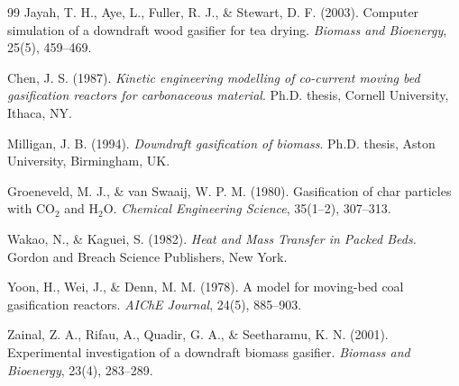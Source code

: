 \documentclass[11pt,a4paper]{article}
\begin{document}
\begin{thebibliography}{99}
Jayah, T. H., Aye, L., Fuller, R. J., \& Stewart, D. F. (2003). Computer simulation of a downdraft wood gasifier for tea drying. \textit{Biomass and Bioenergy}, 25(5), 459--469.

Chen, J. S. (1987). \textit{Kinetic engineering modelling of co-current moving bed gasification reactors for carbonaceous material}. Ph.D. thesis, Cornell University, Ithaca, NY.

Milligan, J. B. (1994). \textit{Downdraft gasification of biomass}. Ph.D. thesis, Aston University, Birmingham, UK.

Groeneveld, M. J., \& van Swaaij, W. P. M. (1980). Gasification of char particles with CO$_2$ and H$_2$O. \textit{Chemical Engineering Science}, 35(1--2), 307--313.

Wakao, N., \& Kaguei, S. (1982). \textit{Heat and Mass Transfer in Packed Beds}. Gordon and Breach Science Publishers, New York.

Yoon, H., Wei, J., \& Denn, M. M. (1978). A model for moving-bed coal gasification reactors. \textit{AIChE Journal}, 24(5), 885--903.

Zainal, Z. A., Rifau, A., Quadir, G. A., \& Seetharamu, K. N. (2001). Experimental investigation of a downdraft biomass gasifier. \textit{Biomass and Bioenergy}, 23(4), 283--289.
\end{thebibliography}

\newpage
\appendix
\end{document}
